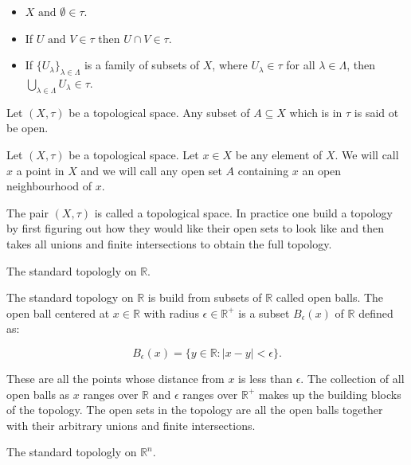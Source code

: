\begin{itemize}
    \item $X \text{ and } \emptyset \in \tau$.
    \item If $U \text{ and } V \in \tau$ then $U \cap V \in \tau$.
    \item If $\{U_\lambda\}_{\lambda \in \Lambda}$ is a family of subsets of $X$, where $U_\lambda \in \tau$ for all $\lambda \in \Lambda$, then 
        $\bigcup_{\lambda \in \Lambda}{U_\lambda} \in \tau$.
\end{itemize}

\begin{defn} Let $(X, \tau)$ be a topological space. Any subset of $A \subseteq X$ which is in $\tau$ is said ot be open.  \end{defn}

\begin{defn} Let $(X, \tau)$ be a topological space. Let $x \in X$ be any element of $X$. We will call $x$ a point in $X$ and we will call any open set $A$ containing $x$ an open neighbourhood of $x$.  \end{defn}

The pair $(X, \tau)$ is called a topological space. In practice one build a topology by first figuring out how they would like their open sets to look like and then takes all unions and finite intersections to obtain the full topology.

\begin{ex} The standard topologly on $\mathbb{R}$.  \end{ex}

The standard topology on $\mathbb{R}$ is build from subsets of $\mathbb{R}$ called open balls. The open ball centered at $x \in \mathbb{R}$ with radius $\epsilon \in \mathbb{R}^+$ is a subset $B_\epsilon(x)$ of $\mathbb{R}$ defined as:

$$ B_\epsilon(x) = \{y \in \mathbb{R} : |x - y| < \epsilon \} .$$

These are all the points whose distance from $x$ is less than $\epsilon$. The collection of all open balls as $x$ ranges over $\mathbb{R}$ and $\epsilon$ ranges over $\mathbb{R}^+$ makes up the building blocks of the topology. The open sets in the topology are all the open balls together with their arbitrary unions and finite intersections.


\begin{ex} The standard topologly on $\mathbb{R}^n$.  \end{ex}

